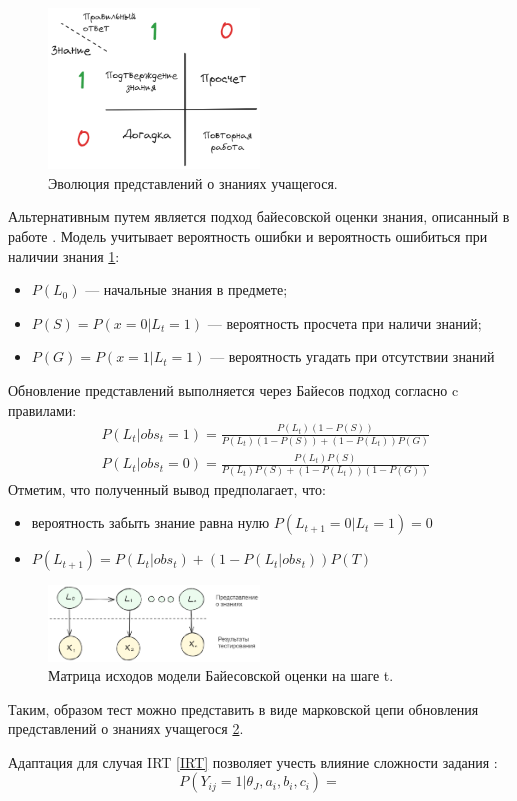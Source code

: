 \begin{figure}[h]
    \centering
    \includegraphics[width=0.5\textwidth]{assets/pedagogic/social/bkt.excalidraw.png}
    \caption{Эволюция представлений о знаниях учащегося.}
    \label{bkt}
\end{figure}
Альтернативным путем является подход байесовской оценки знания, описанный в работе \cite{corbett1994knowledge}.
Модель учитывает вероятность ошибки и вероятность ошибиться при наличии знания \ref{bkt}: 
\begin{itemize}
    \item $P(L_0)$ --- начальные знания в предмете;
    \item $P(S) = P(x=0| L_t = 1)$ --- вероятность просчета при наличи знаний;
    \item  $P(G) = P(x=1| L_t = 1)$ --- вероятность угадать при отсутствии знаний
\end{itemize}
Обновление представлений выполняется через Байесов подход согласно c правилами:
\begin{equation}
    \begin{aligned}
        &P(L_t| obs_t=1) = \frac{P(L_t)(1-P(S))}{P(L_t)(1-P(S)) + (1-P(L_t))P(G)} \\
        &P(L_t| obs_t=0) = \frac{P(L_t)P(S)}{P(L_t) P(S) + (1-P(L_t))(1-P(G))}
    \end{aligned}
\end{equation}
Отметим, что полученный вывод предполагает, что:
\begin{itemize}
    \item вероятность забыть знание равна нулю $ P(L_{t+1}=0|L_t=1)=0$
    \item $P(L_{t+1}) = P(L_t|obs_t) + \left(1 - P(L_t | obs_t)\right) P(T)$
\end{itemize}
\begin{figure}[h]
    \centering
    \includegraphics[width=0.5\textwidth]{assets/pedagogic/social/bkt_automata.excalidraw.png}
    \caption{Матрица исходов модели Байесовской оценки на шаге t.}
    \label{bkt_automata}
\end{figure}
Таким, образом тест можно представить в виде марковской цепи обновления представлений о знаниях учащегося \ref{bkt_automata}.

Адаптация для случая IRT \ref{IRT} позволяет учесть влияние сложности задания \cite{bulut2023introduction}:
\begin{equation}
    P(Y_{ij}=1| \theta_J, a_i,b_i,c_i) =
\end{equation}


